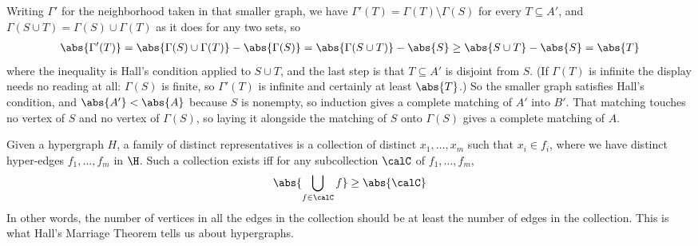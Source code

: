 \begin{iffproof}
\begin{itemize}
            Writing $\Gamma'$ for the neighborhood taken in that smaller graph, we have $\Gamma'(T) = \Gamma(T) \setminus \Gamma(S)$ for every $T \subseteq A'$, and $\Gamma(S \cup T) = \Gamma(S) \cup \Gamma(T)$ as it does for any two sets, so
            \begin{align*}
                \abs{\Gamma'(T)} = \abs{\Gamma(S) \cup \Gamma(T)} - \abs{\Gamma(S)} = \abs{\Gamma(S \cup T)} - \abs{S} \geq \abs{S \cup T} - \abs{S} = \abs{T}
            \end{align*}
            where the inequality is Hall's condition applied to $S \cup T$, and the last step is that $T \subseteq A'$ is disjoint from $S$. (If $\Gamma(T)$ is infinite the display needs no reading at all: $\Gamma(S)$ is finite, so $\Gamma'(T)$ is infinite and certainly at least $\abs{T}$.) So the smaller graph satisfies Hall's condition, and $\abs{A'} < \abs{A}$ because $S$ is nonempty, so induction gives a complete matching of $A'$ into $B'$. That matching touches no vertex of $S$ and no vertex of $\Gamma(S)$, so laying it alongside the matching of $S$ onto $\Gamma(S)$ gives a complete matching of $A$.
    \end{itemize}
\end{iffproof}

Given a hypergraph $H$, a family of distinct representatives is a collection of distinct $x_1, \ldots, x_m$ such that $x_i \in f_i$, where we have distinct hyper-edges $f_1, \ldots, f_m$ in $\H$. Such a collection exists iff for any subcollection $\calC$ of $f_1, \ldots, f_m$,
\begin{align*}
    \abs{\bigcup_{f \in \calC} f} \geq \abs{\calC}
\end{align*}
In other words, the number of vertices in all the edges in the collection should be at least the number of edges in the collection. This is what Hall's Marriage Theorem tells us about hypergraphs.

